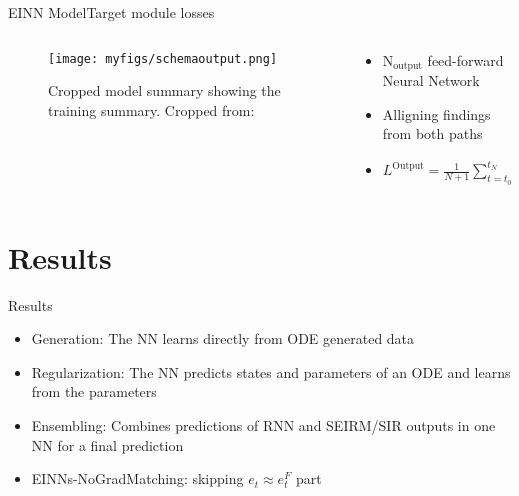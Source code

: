 \documentclass[
	aspectratio=169,	%
	onlytextwidth,		%
	t,					%
	]{beamer}
\begin{document}
\begin{frame}[fragile]{EINN Model}{Target module losses}
	\begin{columns}
		
		\begin{column}[T]{.5\textwidth}
			\begin{figure}
				\texttt{[image: myfigs/schemaoutput.png]}
				\caption{Cropped model summary showing the training summary. Cropped from:~\cite{main}}
			\end{figure}
		\end{column}
		
		\begin{column}[T]{.5\textwidth}
			\begin{itemize}
				\item <1-> N$_{\text{output}}$ feed-forward Neural Network
				\item<2-> Alligning findings from both paths
				\item<3-> $L^{\text{Output}} = \frac{1}{N+1}\sum_{t=t_{0}}^{t_{N}} \left[ s_{t} - s_{t}^{F} \right]^{2}$
			\end{itemize}
		\end{column}
			
\end{columns}
\end{frame}


\section{Results}

\begin{frame}[fragile]{Results}

	\begin{itemize}

		\item Generation: The NN learns directly from ODE generated data~\cite{main, wang, sanchez}
		\item Regularization: The NN predicts states and parameters of an ODE and learns from the parameters~\cite{main, gao, gaw}
		\item Ensembling: Combines predictions of RNN and SEIRM/SIR outputs in one NN for a final prediction~\cite{main, adiga, yamana}
		\item EINNs-NoGradMatching: skipping $e_{t} \approx e_{t}^{F}$ part~\cite{main}

	\end{itemize}

\end{frame}
\end{document}
